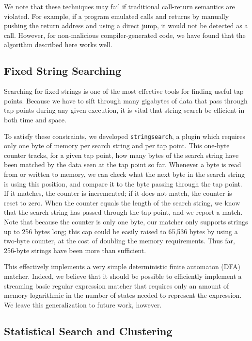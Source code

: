 We note that these techniques may fail if traditional call-return
semantics are violated. For example, if a program emulated calls and
returns by manually pushing the return address and using a direct jump,
it would not be detected as a call. However, for non-malicious
compiler-generated code, we have found that the algorithm described here
works well.

\subsection{Fixed String Searching}
\label{sec:implementation:subsec:stringsearch}

Searching for fixed strings is one of the most effective tools for
finding useful tap points. Because we have to sift through many
gigabytes of data that pass through tap points during any given
execution, it is vital that string search be efficient in both time and
space.

To satisfy these constraints, we developed \texttt{stringsearch}, a
plugin which requires only one byte of memory per search string and per
tap point.  This one-byte counter tracks, for a given tap point, how
many bytes of the search string have been matched by the data seen at
the tap point so far. Whenever a byte is read from or written to memory,
we can check what the next byte in the search string is using this
position, and compare it to the byte passing through the tap point. If
it matches, the counter is incremented; if it does not match, the
counter is reset to zero. When the counter equals the length of the
search string, we know that the search string has passed through the tap
point, and we report a match. Note that because the counter is only one
byte, our matcher only supports strings up to 256 bytes long; this cap
could be easily raised to 65,536 bytes by using a two-byte counter, at
the cost of doubling the memory requirements. Thus far, 256-byte strings
have been more than sufficient.

This effectively implements a very simple deterministic finite automaton
(DFA) matcher. Indeed, we believe that it should be possible to
efficiently implement a streaming basic regular expression matcher that
requires only an amount of memory logarithmic in the number of states
needed to represent the expression. We leave this generalization to
future work, however.

\subsection{Statistical Search and Clustering}
\label{sec:implementation:subsec:bigram}

